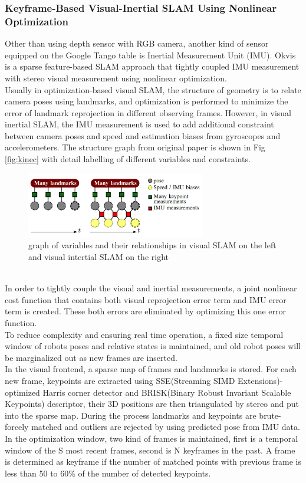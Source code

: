 \documentclass[12pt,twoside]{article}
\begin{document}
\subsubsection{Keyframe-Based Visual-Inertial SLAM Using
Nonlinear Optimization}
Other than using depth sensor with RGB camera, another kind of sensor equipped on the Google Tango table is Inertial Measurement Unit (IMU). Okvis\cite{leutenegger2015keyframe} is a sparse feature-based SLAM approach that tightly coupled IMU measurement with stereo visual measurement using nonlinear optimization.\\
Usually in optimization-based visual SLAM, the structure of geometry is to relate camera poses using landmarks, and optimization is performed to minimize the error of landmark reprojection in different observing frames. However, in visual inertial SLAM, the IMU measurement is used to add additional constraint between camera poses and speed and estimation biases from gyroscopes and accelerometers. The structure graph from original paper is shown in Fig \ref{fig:kinec} with detail labelling of different variables and constraints.\\
\begin{figure}[h]
    \centering
    \includegraphics[width=0.7\textwidth]{figures/okvis}
    \caption{graph of variables and their relationships in visual SLAM on the left and visual intertial SLAM on the right \cite{leutenegger2015keyframe}}
    \label{fig:okvis}
\end{figure}\\
In order to tightly couple the visual and inertial measurements, a joint nonlinear cost function that contains both visual reprojection error term and IMU error term is created. These both errors are eliminated by optimizing this one error function.\\
To reduce complexity and ensuring real time operation, a fixed size temporal window of robots poses and relative states is maintained, and old robot poses will be marginalized out as new frames are inserted.\\
In the visual frontend, a sparse map of frames and landmarks is stored. For each new frame, keypoints are extracted using SSE(Streaming SIMD Extensions)-optimized Harris corner detector and BRISK(Binary Robust Invariant Scalable Keypoints) descriptor, their 3D positions are then triangulated by stereo and put into the sparse map. During the process landmarks and keypoints are brute-forcely matched and outliers are rejected by using predicted pose from IMU data. In the optimization window, two kind of frames is maintained, first is a temporal window of the S most recent frames, second is N keyframes in the past. A frame is determined as keyframe if the number of matched points with previous frame is less than 50 to 60\%  of the number of detected keypoints.\\
\end{document}

